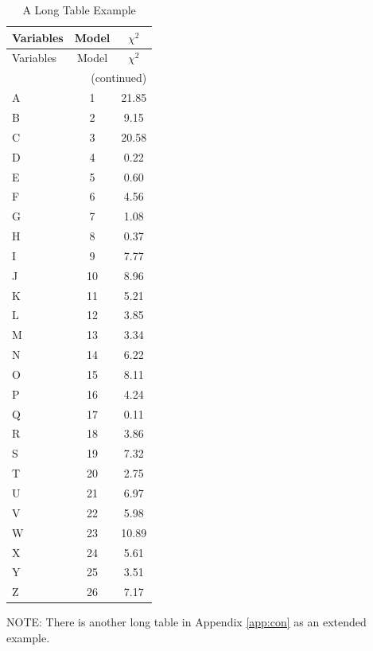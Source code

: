 \newpage
\begin{longtable}{@{\extracolsep{\fill}}lcc}
\caption[A Long Table Example]{A Long Table Example} \label{tab:LongTable} \\

\toprule \multicolumn{1}{l}{Variables} & \multicolumn{1}{c}{Model} & \multicolumn{1}{c}{$\chi^2$} \\ \midrule
\endfirsthead


\toprule \multicolumn{1}{l}{Variables} & \multicolumn{1}{c}{Model} & \multicolumn{1}{c}{$\chi^2$} \\ \midrule
\endhead

\multicolumn{3}{r}{{(continued)}} \\  %
\endfoot

\bottomrule
\endlastfoot
A	&	1	&	21.85	\\
B	&	2	&	9.15	\\
C	&	3	&	20.58	\\
D	&	4	&	0.22	\\
E	&	5	&	0.60	\\
F	&	6	&	4.56	\\
G	&	7	&	1.08	\\
H	&	8	&	0.37	\\
I	&	9	&	7.77	\\
J	&	10	&	8.96	\\
K	&	11	&	5.21	\\
L	&	12	&	3.85	\\
M	&	13	&	3.34	\\
N	&	14	&	6.22	\\
O	&	15	&	8.11	\\
P	&	16	&	4.24	\\
Q	&	17	&	0.11	\\
R	&	18	&	3.86	\\
S	&	19	&	7.32	\\
T	&	20	&	2.75	\\
U	&	21	&	6.97	\\
V	&	22	&	5.98	\\
W	&	23	&	10.89	\\
X	&	24	&	5.61	\\
Y	&	25	&	3.51	\\
Z	&	26	&	7.17	\\
\end{longtable}

NOTE: There is another long table in Appendix \ref{app:con} as an extended example.


